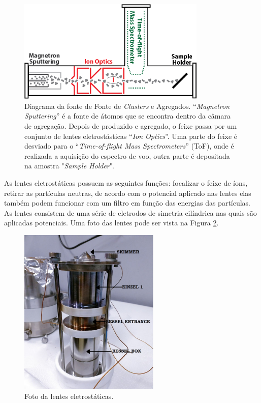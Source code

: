 \begin{figure}
  \centering
  \includegraphics[width=0.8\textwidth]{images/esquematico_foca}
  \caption{ Diagrama da fonte de Fonte de \textit{Clusters} e Agregados. ``\textit{Magnetron Sputtering}'' é a fonte de átomos que se encontra dentro da câmara de agregação. Depois de produzido e agregado, o feixe passa por um conjunto de lentes eletrostásticas  ``\textit{Ion Optics}''. Uma parte do feixe é desviado para o ``\textit{Time-of-flight Mass Spectrometers}'' (ToF), onde é realizada a aquisição do espectro de voo, outra parte é depositada na amostra "\textit{Sample Holder}"\cite{livro_vitor}.  }
  \label{fig:esquema_foca}
\end{figure}

As lentes eletrostáticas possuem as seguintes funções: focalizar o feixe de íons, retirar as partículas neutras, de acordo com o potencial aplicado nas lentes elas também podem funcionar com um filtro em função das energias das partículas. As lentes consistem de uma série de eletrodos de simetria cilíndrica nas quais são aplicadas potenciais. Uma foto das lentes pode ser vista na Figura \ref{fig:foto_lentes}.

\begin{figure}
  \centering
  \includegraphics[width=0.6\textwidth]{images/lentes}
  \caption{ Foto da lentes eletrostáticas.  }
  \label{fig:foto_lentes}
\end{figure}



